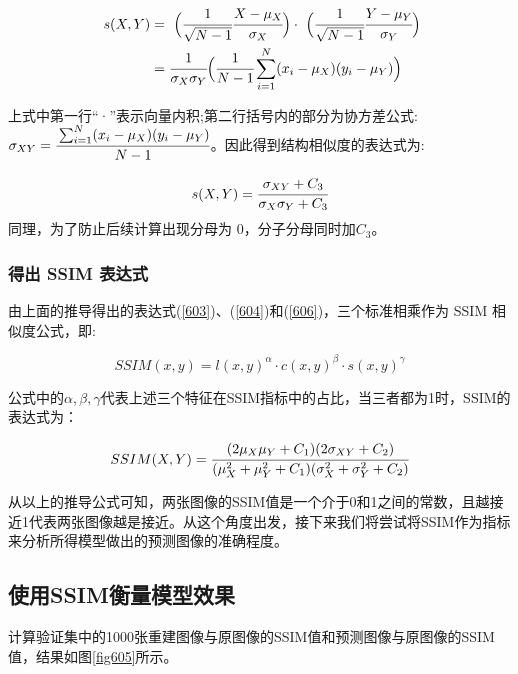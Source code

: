 \begin{equation}\label{605}
	\begin{split}
		\ s(X,Y) &= \ \Big (\cfrac{1}{\sqrt{N-1}}\cfrac{X-\mu_X}{\sigma_X} \Big) \cdot \ \Big(\cfrac{1}{\sqrt{N-1}}\cfrac{Y-\mu_Y}{\sigma_Y}\Big)\\
		&= \cfrac{1}{\sigma_X\sigma_Y}\Big (\cfrac{1}{N-1}\sum_{i=1}^N(x_i-\mu_X)(y_i-\mu_Y) \Big )
	\end{split}
\end{equation}

上式中第一行“·”表示向量内积;第二行括号内的部分为协方差公式:$\sigma_{XY}=\cfrac{\sum_{i=1}^N(x_i-\mu_X)(y_i-\mu_Y)}{N-1}$。因此得到结构相似度的表达式为:

\begin{equation}\label{606}
s(X,Y)=\cfrac{\sigma_{XY}+C_3}{\sigma_X\sigma_Y+C_3}
\end{equation}
同理，为了防止后续计算出现分母为 0，分子分母同时加$C_3$。

\subsubsection{得出 SSIM 表达式}
由上面的推导得出的表达式(\ref{603})、(\ref{604})和(\ref{606})，三个标准相乘作为 SSIM 相似度公式，即:

\begin{equation}\label{607}
	SSIM(x,y)=l(x,y)^{\alpha}\cdot c(x,y)^{\beta} \cdot s(x,y)^{\gamma}
\end{equation}

公式中的$\alpha ,\beta ,\gamma$代表上述三个特征在SSIM指标中的占比，当三者都为1时，SSIM的表达式为：

\begin{equation}\label{608}
SSIM(X,Y)=\cfrac{(2\mu_X\mu_Y+C_1)(2\sigma_{XY}+C_2)}{(\mu_X^2+\mu_Y^2+C_1)(\sigma_X^2+\sigma_Y^2+C_2)}
\end{equation}

从以上的推导公式可知，两张图像的SSIM值是一个介于0和1之间的常数，且越接近1代表两张图像越是接近。从这个角度出发，接下来我们将尝试将SSIM作为指标来分析所得模型做出的预测图像的准确程度。

\subsection{使用SSIM衡量模型效果}
计算验证集中的1000张重建图像与原图像的SSIM值和预测图像与原图像的SSIM值，结果如图\ref{fig605}所示。

